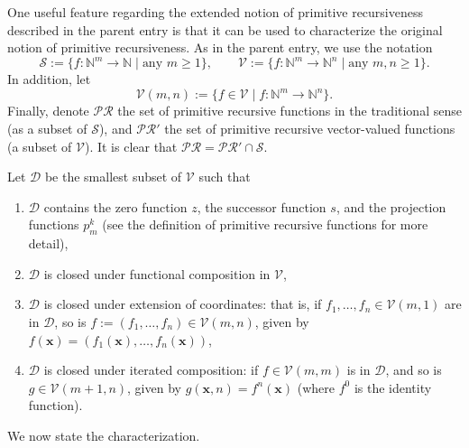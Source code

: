 \documentclass[12pt]{article}
\begin{document}
One useful feature regarding the extended notion of primitive recursiveness described in the parent entry is that it can be used to characterize the original notion of primitive recursiveness.  As in the parent entry, we use the notation $$\mathcal{S}:=\lbrace f:\mathbb{N}^m \to \mathbb{N} \mid \mbox{any }m\ge 1\rbrace, \qquad \mathcal{V}:=\lbrace f:\mathbb{N}^m \to \mathbb{N}^n \mid \mbox{any }m,n \ge 1\rbrace.$$  In addition, let $$\mathcal{V}(m,n):=\lbrace f \in \mathcal{V}\mid f:\mathbb{N}^m \to \mathbb{N}^n \rbrace.$$  Finally, denote $\mathcal{PR}$ the set of primitive recursive functions in the traditional sense (as a subset of $\mathcal{S}$), and $\mathcal{PR}'$ the set of primitive recursive vector-valued functions (a subset of $\mathcal{V}$).  It is clear that $\mathcal{PR}=\mathcal{PR}'\cap \mathcal{S}$.

Let $\mathcal{D}$ be the smallest subset of $\mathcal{V}$ such that
\begin{enumerate}
\item $\mathcal{D}$ contains the zero function $z$, the successor function $s$, and the projection functions $p_m^k$ (see the definition of primitive recursive functions for more detail),
\item $\mathcal{D}$ is closed under functional composition in $\mathcal{V}$,
\item $\mathcal{D}$ is closed under extension of coordinates: that is, if $f_1,\ldots, f_n\in \mathcal{V}(m,1)$ are in $\mathcal{D}$, so is $f:=(f_1,\ldots,f_n)\in \mathcal{V}(m,n)$, given by $f(\boldsymbol{x})=(f_1(\boldsymbol{x}),\ldots, f_n(\boldsymbol{x}))$, 
\item $\mathcal{D}$ is closed under iterated composition: if $f\in \mathcal{V}(m,m)$ is in $\mathcal{D}$, and so is $g\in \mathcal{V}(m+1,n)$, given by $g(\boldsymbol{x},n)=f^n(\boldsymbol{x})$ (where $f^0$ is the identity function).
\end{enumerate}

We now state the characterization.
\end{document}
